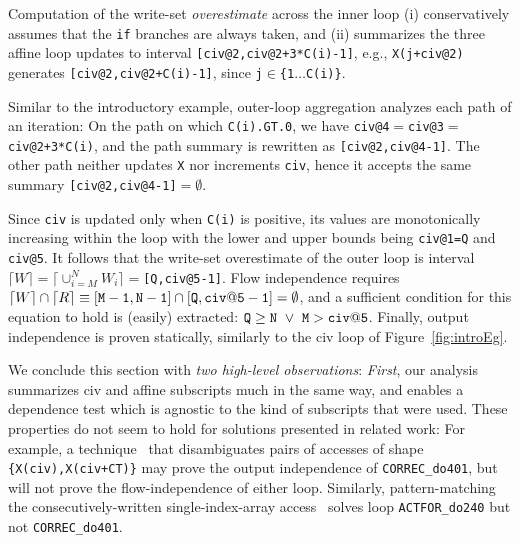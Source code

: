 \documentclass{sig-alternate}
\begin{document}
Computation of the write-set {\em overestimate} across the inner loop 
(i)  conservatively assumes that the {\tt if} branches are always taken, and
(ii) summarizes the three affine loop updates 
to interval {\tt[civ@2,civ@2+3*C(i)-1]},
e.g., {\tt X(j+civ@2)} generates {\tt[civ@2,civ@2+C(i)-1]}, since  
{\tt j$\in$\{1$\ldots$C(i)\}}.

Similar to the introductory example, outer-loop aggregation
analyzes each path of an iteration:
On the path on which {\tt C(i).GT.0}, we have %
{\tt civ@4$=$civ@3$=$civ@2+3*C(i)}, and the path summary is
rewritten as {\tt [civ@2,civ@4-1]}. The other path neither 
updates {\tt X} nor increments {\tt civ}, hence it accepts the
same summary {\tt[civ@2,civ@4-1]$=\emptyset$}.

Since {\tt civ} is updated only when {\tt C(i)} is positive,
its values are monotonically increasing within the loop with
the lower and upper bounds being {\tt civ@1=Q} and {\tt civ@5}. 
It follows that the write-set overestimate of the outer loop is 
interval $\lceil W \rceil = \lceil \cup_{i=M}^{N}W_i\rceil =${\tt[Q,civ@5-1]}.
Flow independence requires   
$\lceil W\rceil\cap\lceil R \rceil \equiv {\tt [M-1,N-1]}\cap{\tt{}[Q,civ@5-1]}=\emptyset$,
and a sufficient condition for this equation to hold is (easily) extracted:
${\tt Q} \ge {\tt N}~\vee~{\tt M} > {\tt{}civ@5}$.
%
Finally, output independence is proven statically, similarly to the 
{\sc civ} loop of Figure~\ref{fig:introEg}.

\vspace{1ex}
We conclude this section with {\em two high-level observations}: %
{\em First}, our analysis summarizes {\sc civ} and affine subscripts
much in the same way, and enables a dependence test which is agnostic
to the kind of subscripts that were used.
%
% 
%
These properties do not seem to hold for solutions presented in related
work: For example, a technique~\cite{CohenBeyondMon} that disambiguates 
pairs of accesses of shape {\tt \{X(civ),X(civ+CT)\}} may prove the output 
independence of {\tt CORREC\_do401}, but will not prove the flow-independence 
of either loop.
Similarly, pattern-matching the consecutively-written single-index-array
access~\cite{PaduaStackArr,VEG} solves loop  {\tt ACTFOR\_do240} but not
{\tt CORREC\_do401}.
\end{document}
